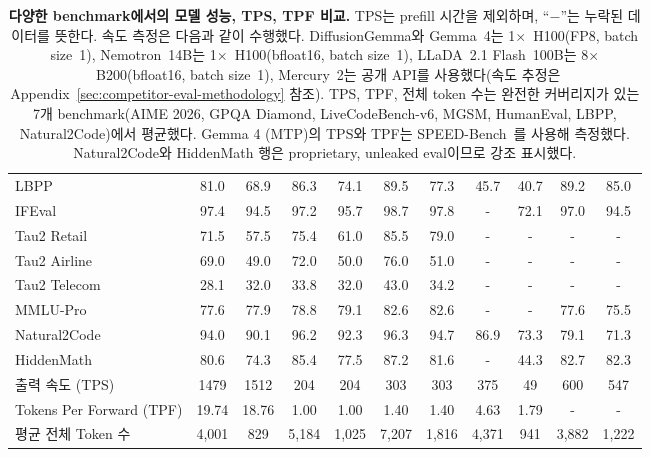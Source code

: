\documentclass[11pt, a4paper, logo, copyright, gdm]{google}
\begin{document}
\begin{landscape}
\begin{table}[t!]
\begin{tabular}{lcccccccccc}
LBPP & 81.0 & 68.9 & 86.3 & 74.1 & 89.5 & 77.3 & 45.7 & 40.7 & 89.2 & 85.0 \\
IFEval & 97.4 & 94.5 & 97.2 & 95.7 & 98.7 & 97.8 & - & 72.1 & 97.0 & 94.5 \\
Tau2 Retail & 71.5 & 57.5 & 75.4 & 61.0 & 85.5 & 79.0 & - & - & - & - \\
Tau2 Airline & 69.0 & 49.0 & 72.0 & 50.0 & 76.0 & 51.0 & - & - & - & - \\
Tau2 Telecom & 28.1 & 32.0 & 33.8 & 32.0 & 43.0 & 34.2 & - & - & - & - \\
MMLU-Pro & 77.6 & 77.9 & 78.8 & 79.1 & 82.6 & 82.6 & - & - & 77.6 & 75.5 \\
\rowcolor{benchmarkhighlight}
Natural2Code & 94.0 & 90.1 & 96.2 & 92.3 & 96.3 & 94.7 & 86.9 & 73.3 & 79.1 & 71.3 \\
\rowcolor{benchmarkhighlight}
HiddenMath & 80.6 & 74.3 & 85.4 & 77.5 & 87.2 & 81.6 & - & 44.3 & 82.7 & 82.3 \\
\midrule
출력 속도 (TPS) & 1479 & 1512 & 204 & 204 & 303 & 303 & 375 & 49 & 600 & 547 \\
Tokens Per Forward (TPF) & 19.74 & 18.76 & 1.00 & 1.00 & 1.40 & 1.40 & 4.63 & 1.79 & - & - \\
평균 전체 Token 수 & 4,001 & 829 & 5,184 & 1,025 & 7,207 & 1,816 & 4,371 & 941 & 3,882 & 1,222 \\
\bottomrule
\end{tabular}
\caption{\textbf{다양한 benchmark에서의 모델 성능, TPS, TPF 비교.} TPS는 prefill 시간을 제외하며, ``$-$''는 누락된 데이터를 뜻한다. 속도 측정은 다음과 같이 수행했다. DiffusionGemma와 Gemma~4는 1$\times$~H100(FP8, batch size~1), Nemotron~14B는 1$\times$~H100(bfloat16, batch size~1), LLaDA~2.1 Flash~100B는 8$\times$~B200(bfloat16, batch size~1), Mercury~2는 공개 API를 사용했다(속도 추정은 Appendix~\ref{sec:competitor-eval-methodology} 참조). TPS, TPF, 전체 token 수는 완전한 커버리지가 있는 7개 benchmark(AIME 2026, GPQA Diamond, LiveCodeBench-v6, MGSM, HumanEval, LBPP, Natural2Code)에서 평균했다. Gemma 4 (MTP)의 TPS와 TPF는 SPEED-Bench~\citep{abramovich2026speed}를 사용해 측정했다. Natural2Code와 HiddenMath 행은 proprietary, unleaked eval이므로 강조 표시했다.
}
\label{tab:model_comparison}
\end{table}


\end{landscape}
\end{document}
